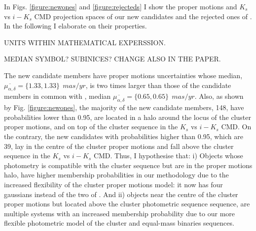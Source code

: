 In Figs. \ref{figure:newones} and \ref{figure:rejecteds} I show the proper motions and $K_s$ vs $i-K_s$ CMD projection spaces of our new candidates and the rejected ones  of \citet{Bouy2015}. In the following I elaborate on their properties.

UNITS WITHIN MATHEMATICAL EXPERSSION.

MEDIAN SYMBOL? SUBINICES? CHANGE ALSO IN THE PAPER.

The new candidate members have proper motions uncertainties whose median, $\overline{\mu_{\alpha,\delta}}=\{1.33,1.33\} \ \ mas/yr$, is two times larger than those of the candidate members in common with \citet{Bouy2015}, median $\overline{\mu_{\alpha,\delta}}=\{0.65,0.65\} \ \ mas/yr$. Also, as shown by Fig. \ref{figure:newones}, the majority of the new candidate members, 148, have probabilities lower than 0.95, are located in a halo around the locus of the cluster proper motions, and on top of the cluster sequence in the $K_s$ vs $i-K_s$ CMD. On the contrary, the new candidates with probabilities higher than 0.95, which are 39, lay in the centre of the cluster proper motions and fall above the cluster sequence in the $K_s$ vs $i-K_s$ CMD. Thus, I hypothesise that: i) Objects whose photometry is compatible with the cluster sequence but are in the proper motions halo, have higher membership probabilities in our methodology due to the increased flexibility of the cluster proper motions model: it now has four gaussians instead of the two of \citet{Bouy2015}. And ii) objects near the centre of the cluster proper motions but located above the cluster photometric sequence sequence, are multiple systems \cite[probably triple systems which can amount to 4\% of the population][]{Duquennoy1991} with an increased membership probability due to our more flexible photometric model of the cluster and equal-mass binaries sequences.

